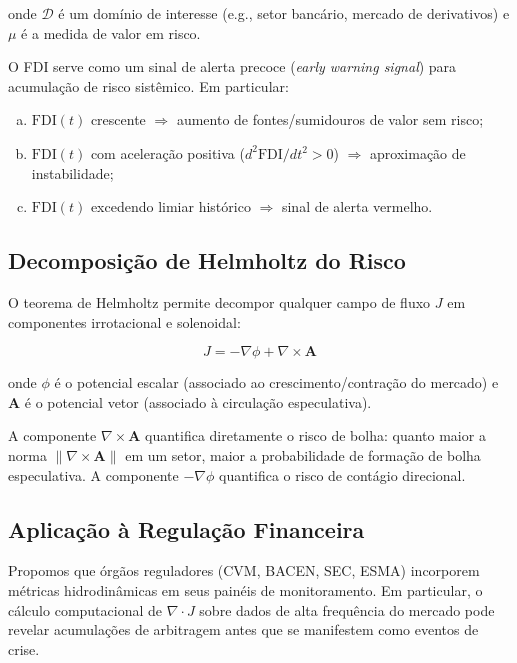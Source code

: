 onde $\mathcal{D}$ \'e um dom\'inio de interesse (e.g., setor banc\'ario, mercado de derivativos) e $\mu$ \'e a medida de valor em risco.

O FDI serve como um sinal de alerta precoce (\textit{early warning signal}) para acumula\c{c}\~ao de risco sist\^emico. Em particular:

\begin{enumerate}[(a)]
 \item $\text{FDI}(t)$ crescente $\Rightarrow$ aumento de fontes/sumidouros de valor sem risco;
 \item $\text{FDI}(t)$ com acelera\c{c}\~ao positiva ($d^2\text{FDI}/dt^2 > 0$) $\Rightarrow$ aproxima\c{c}\~ao de instabilidade;
 \item $\text{FDI}(t)$ excedendo limiar hist\'orico $\Rightarrow$ sinal de alerta vermelho.
\end{enumerate}

\subsection{Decomposi\c{c}\~ao de Helmholtz do Risco}

O teorema de Helmholtz permite decompor qualquer campo de fluxo $J$ em componentes irrotacional e solenoidal:

\begin{equation}\label{eq:helmholtz-decomp}
J = -\nabla \phi + \nabla \times \mathbf{A}
\end{equation}

onde $\phi$ \'e o potencial escalar (associado ao crescimento/contra\c{c}\~ao do mercado) e $\mathbf{A}$ \'e o potencial vetor (associado \`a circula\c{c}\~ao especulativa).

A componente $\nabla \times \mathbf{A}$ quantifica diretamente o risco de bolha: quanto maior a norma $\|\nabla \times \mathbf{A}\|$ em um setor, maior a probabilidade de forma\c{c}\~ao de bolha especulativa. A componente $-\nabla\phi$ quantifica o risco de cont\'agio direcional.

\subsection{Aplica\c{c}\~ao \`a Regula\c{c}\~ao Financeira}

Propomos que \'org\~aos reguladores (CVM, BACEN, SEC, ESMA) incorporem m\'etricas hidrodin\^amicas em seus pain\'eis de monitoramento. Em particular, o c\'alculo computacional de $\nabla \cdot J$ sobre dados de alta frequ\^encia do mercado pode revelar acumula\c{c}\~oes de arbitragem antes que se manifestem como eventos de crise.

